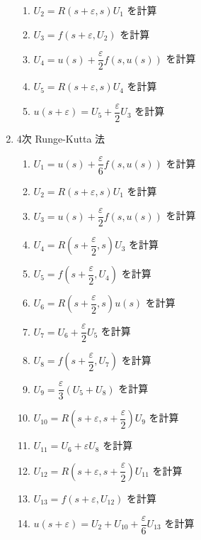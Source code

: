 \documentclass[12pt, a4j]{jsarticle}
\newcommand{\e}{\varepsilon}
\begin{document}
\begin{enumerate}[label=(\arabic*)]
\begin{enumerate}[label={Step\arabic{*}.}]
   \item $U_{2} = R(s + \e, s) U_{1}$ を計算
   \item $U_{3} = f(s + \e, U_{2})$ を計算
   \item $U_{4} = u(s) + \dfrac{\e}{2} f(s, u(s))$ を計算
   \item $U_{5} = R(s + \e, s) U_{4}$ を計算
   \item $u(s + \e) = U_{5} + \dfrac{\e}{2} U_{3}$ を計算
  \end{enumerate}
 \item 4次 Runge-Kutta 法
  \begin{enumerate}[label=Step{\arabic*}.]
   \item $U_{1} = u(s) + \dfrac{\e}{6} f(s, u(s))$ を計算
   \item $U_{2} = R(s + \e, s) U_{1}$ を計算
   \item $U_{3} = u(s) + \dfrac{\e}{2} f(s, u(s))$ を計算
   \item $U_{4} = R\left(s + \dfrac{\e}{2}, s\right) U_{3}$ を計算
   \item $U_{5} = f\left(s + \dfrac{\e}{2}, U_{4}\right)$ を計算
   \item $U_{6} = R\left(s + \dfrac{\e}{2}, s\right) u(s)$ を計算
   \item $U_{7} = U_{6} + \dfrac{\e}{2} U_{5}$ を計算
   \item $U_{8} = f\left(s + \dfrac{\e}{2}, U_{7}\right)$ を計算
   \item $U_{9} = \dfrac{\e}{3}(U_{5} + U_{8})$ を計算
   \item $U_{10} = R\left(s + \e, s + \dfrac{\e}{2}\right) U_{9}$
	 を計算
   \item $U_{11} = U_{6} + \e U_{8}$ を計算
   \item $U_{12} = R\left(s + \e, s + \dfrac{\e}{2}\right) U_{11}$
	 を計算
   \item $U_{13} = f\left(s + \e, U_{12}\right)$ を計算
   \item $u(s + \e) = U_{2} + U_{10} + \dfrac{\e}{6} U_{13}$
	 を計算
  \end{enumerate}
\end{enumerate}
\end{document}
